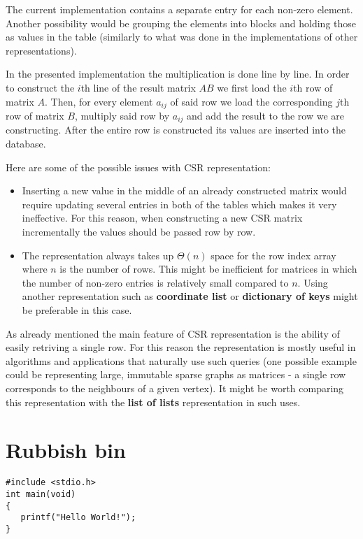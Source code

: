 \documentclass{article}
\begin{document}
The current implementation contains a separate entry for each non-zero element. Another possibility would be grouping the elements into blocks and holding those as values in the table (similarly to what was done in the implementations of other representations).

In the presented implementation the multiplication is done line by line. In order to construct the $i$th line of the result matrix $AB$ we first load the $i$th row of matrix $A$. Then, for every element $a_{ij}$ of said row we load the corresponding $j$th row of matrix $B$, multiply said row by $a_{ij}$ and add the result to the row we are constructing. After the entire row is constructed its values are inserted into the database.

Here are some of the possible issues with CSR representation:
\begin{itemize}
\item Inserting a new value in the middle of an already constructed matrix would require updating several entries in both of the tables which makes it very ineffective. For this reason, when constructing a new CSR matrix incrementally the values should be passed row by row.

\item The representation always takes up $\Theta(n)$ space for the row index array where $n$ is the number of rows. This might be inefficient for matrices in which the number of non-zero entries is relatively small compared to $n$. Using another representation such as \textbf{coordinate list} or \textbf{dictionary of keys} might be preferable in this case.
\end{itemize}

As already mentioned the main feature of CSR representation is the ability of easily retriving a single row. For this reason the representation is mostly useful in algorithms and applications that naturally use such queries (one possible example could be representing large, immutable sparse graphs as matrices - a single row corresponds to the neighbours of a given vertex). It might be worth comparing this representation with the \textbf{list of lists} representation in such uses.


\pagebreak
\section*{Rubbish bin}

\begin{lstlisting}[style=CStyle]
#include <stdio.h>
int main(void)
{
   printf("Hello World!"); 
}
\end{lstlisting}
\end{document}
